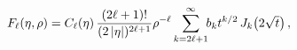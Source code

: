 \[\mathop{F_{\ell}\/}\nolimits\!\left(\eta,\rho\right)=\mathop{C_{\ell}\/}%
\nolimits\!\left(\eta\right)\frac{(2\ell+1)!}{(2\left|\eta\right|)^{2\ell+1}}%
\rho^{-\ell}\*\sum_{k=2\ell+1}^{\infty}\!\!b_{k}t^{k/2}\mathop{J_{k}\/}%
\nolimits\!\left(\textstyle 2\sqrt{t}\right),\]